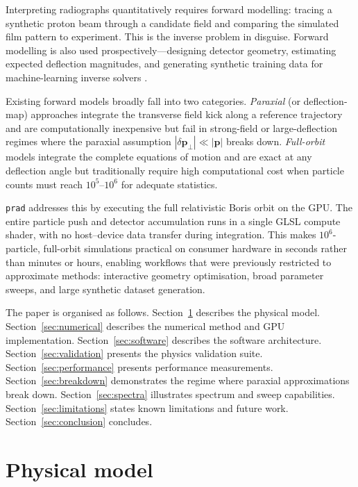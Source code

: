 \documentclass[review,12pt]{elsarticle}
\begin{document}
Interpreting radiographs quantitatively requires forward modelling: tracing a synthetic
proton beam through a candidate field and comparing the simulated film pattern to
experiment. This is the inverse problem in disguise. Forward modelling is also used
prospectively—designing detector geometry, estimating expected deflection magnitudes,
and generating synthetic training data for machine-learning inverse solvers
\cite{kasim2019,papp2022}.

Existing forward models broadly fall into two categories. \emph{Paraxial} (or
deflection-map) approaches integrate the transverse field kick along a reference
trajectory and are computationally inexpensive but fail in strong-field or large-deflection
regimes where the paraxial assumption $|\delta \mathbf{p}_\perp| \ll |\mathbf{p}|$
breaks down. \emph{Full-orbit} models integrate the complete equations of motion and
are exact at any deflection angle but traditionally require high computational cost
when particle counts must reach $10^5$–$10^6$ for adequate statistics.

\texttt{prad} addresses this by executing the full relativistic Boris orbit on the GPU.
The entire particle push and detector accumulation runs in a single GLSL compute shader,
with no host–device data transfer during integration. This makes
$10^6$-particle, full-orbit simulations practical on consumer hardware in seconds rather
than minutes or hours, enabling workflows that were previously restricted to approximate
methods: interactive geometry optimisation, broad parameter sweeps, and large synthetic
dataset generation.

The paper is organised as follows. Section~\ref{sec:physics} describes the physical model.
Section~\ref{sec:numerical} describes the numerical method and GPU implementation.
Section~\ref{sec:software} describes the software architecture.
Section~\ref{sec:validation} presents the physics validation suite.
Section~\ref{sec:performance} presents performance measurements.
Section~\ref{sec:breakdown} demonstrates the regime where paraxial approximations break down.
Section~\ref{sec:spectra} illustrates spectrum and sweep capabilities.
Section~\ref{sec:limitations} states known limitations and future work.
Section~\ref{sec:conclusion} concludes.

\section{Physical model}
\label{sec:physics}
\end{document}
